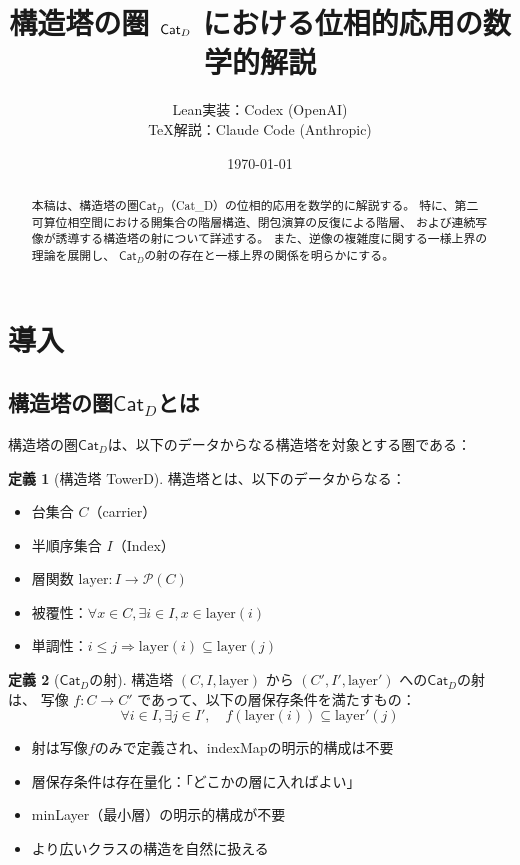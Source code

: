 \documentclass[a4paper,12pt]{ltjsarticle}
\title{構造塔の圏 $\catD$ における位相的応用の数学的解説}
\author{%
  Lean実装：Codex (OpenAI) \\
  \TeX 解説：Claude Code (Anthropic)
}
\date{\today}
\theoremstyle{definition}
\newtheorem{definition}{定義}[section]
\newcommand{\catD}{\mathsf{Cat}_D}
\begin{document}
\maketitle

\begin{abstract}
本稿は、構造塔の圏$\catD$（Cat\_D）の位相的応用を数学的に解説する。
特に、第二可算位相空間における開集合の階層構造、閉包演算の反復による階層、
および連続写像が誘導する構造塔の射について詳述する。
また、逆像の複雑度に関する一様上界の理論を展開し、
$\catD$の射の存在と一様上界の関係を明らかにする。
\end{abstract}

\tableofcontents

\section{導入}

\subsection{構造塔の圏$\catD$とは}

構造塔の圏$\catD$は、以下のデータからなる構造塔を対象とする圏である：

\begin{definition}[構造塔 TowerD]
構造塔とは、以下のデータからなる：
\begin{itemize}
  \item 台集合 $C$（carrier）
  \item 半順序集合 $I$（Index）
  \item 層関数 $\mathrm{layer} : I \to \mathcal{P}(C)$
  \item 被覆性：$\forall x \in C, \exists i \in I, x \in \mathrm{layer}(i)$
  \item 単調性：$i \leq j \Rightarrow \mathrm{layer}(i) \subseteq \mathrm{layer}(j)$
\end{itemize}
\end{definition}

\begin{definition}[$\catD$の射]
構造塔 $(C, I, \mathrm{layer})$ から $(C', I', \mathrm{layer}')$ への$\catD$の射は、
写像 $f: C \to C'$ であって、以下の層保存条件を満たすもの：
\[
\forall i \in I, \exists j \in I', \quad f(\mathrm{layer}(i)) \subseteq \mathrm{layer}'(j)
\]
\end{definition}

\begin{keybox}[title=Cat\_Dの特徴]
\begin{itemize}
  \item 射は写像$f$のみで定義され、indexMapの明示的構成は不要
  \item 層保存条件は存在量化：「どこかの層に入ればよい」
  \item minLayer（最小層）の明示的構成が不要
  \item より広いクラスの構造を自然に扱える
\end{itemize}
\end{keybox}
\end{document}
